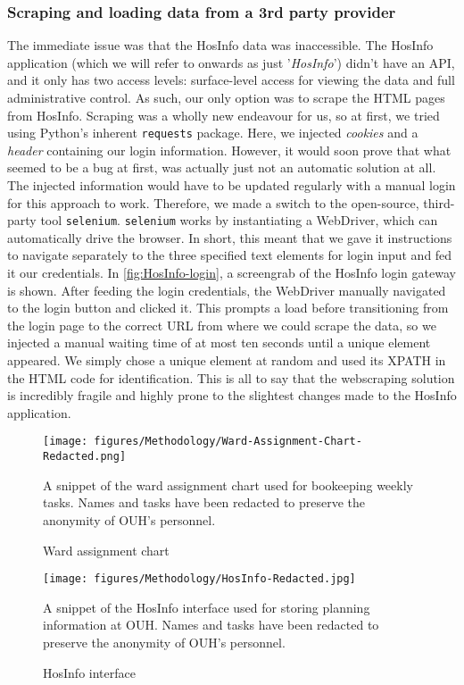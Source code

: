 \subsubsection*{Scraping and loading data from a 3rd party provider}
The immediate issue was that the HosInfo data was inaccessible. The HosInfo application (which we will refer to onwards as just '\emph{HosInfo}') didn't have an API, and it only has two access levels: surface-level access for viewing the data and full administrative control. As such, our only option was to scrape the HTML pages from HosInfo. Scraping was a wholly new endeavour for us, so at first, we tried using Python's inherent \texttt{requests} package. Here, we injected \emph{cookies} and a \emph{header} containing our login information. However, it would soon prove that what seemed to be a bug at first, was actually just not an automatic solution at all. The injected information would have to be updated regularly with a manual login for this approach to work. Therefore, we made a switch to the open-source, third-party tool \texttt{selenium}. \texttt{selenium} works by instantiating a WebDriver, which can automatically drive the browser. In short, this meant that we gave it instructions to navigate separately to the three specified text elements for login input and fed it our credentials. In \autoref{fig:HosInfo-login}, a screengrab of the HosInfo login gateway is shown. After feeding the login credentials, the WebDriver manually navigated to the login button and clicked it. This prompts a load before transitioning from the login page to the correct URL from where we could scrape the data, so we injected a manual waiting time of at most ten seconds until a unique element appeared. We simply chose a unique element at random and used its XPATH in the HTML code for identification. This is all to say that the webscraping solution is incredibly fragile and highly prone to the slightest changes made to the HosInfo application.

\begin{figure}[H]
    \centering
    \texttt{[image: figures/Methodology/Ward-Assignment-Chart-Redacted.png]}
    \caption{Ward assignment chart}
    \small
    \raggedright 
    A snippet of the ward assignment chart used for bookeeping weekly tasks. Names and tasks have been redacted to preserve the anonymity of OUH's personnel. 
    \label{fig:wac-snippet}
\end{figure}

\begin{figure}[H]
    \centering
    \texttt{[image: figures/Methodology/HosInfo-Redacted.jpg]}
    \caption{HosInfo interface}
    \small
    \raggedright 
    A snippet of the HosInfo interface used for storing planning information at OUH. Names and tasks have been redacted to preserve the anonymity of OUH's personnel. 
    \label{fig:HosInfo-snippet}
\end{figure}

